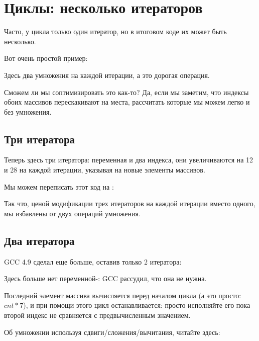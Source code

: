 ﻿\chapter{Циклы: несколько итераторов}
\label{loop_iterators}

Часто, у цикла только один итератор, но в итоговом коде их может быть несколько.

Вот очень простой пример:



Здесь два умножения на каждой итерации, а это дорогая операция.

Сможем ли мы соптимизировать это как-то?
Да, если мы заметим, что индексы обоих массивов перескакивают на места, рассчитать которые мы
можем легко и без умножения.

\section{Три итератора}



Теперь здесь три итератора: переменная  и два индекса, они увеличиваются на 12 и 28 на каждой
итерации, указывая на новые элементы массивов.

Мы можем переписать этот код на \CCpp:



Так что, ценой модификации трех итераторов на каждой итерации вместо одного, 
мы избавлены от двух операций умножения.

\section{Два итератора}

GCC 4.9 сделал еще больше, оставив только 2 итератора:



Здесь больше нет переменной-: GCC рассудил, что она не нужна.

Последний элемент массива  вычисляется перед началом цикла (а это просто: $cnt*7$),
и при помощи этого цикл останавливается: просто исполняйте его пока второй индекс не сравняется
с предвычисленным значением.

Об умножении используя сдвиги/сложения/вычитания, читайте здесь:
 
